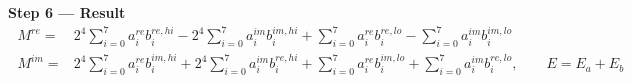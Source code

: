 \documentclass[fleqn]{article}
\begin{document}
\textbf{Step 6 --- Result}
\[
\boxed{\;
\begin{aligned}
M^{re} ={}& 2^{4}\!\sum_{i=0}^{7} a_i^{re} b_i^{re,hi}
  - 2^{4}\!\sum_{i=0}^{7} a_i^{im} b_i^{im,hi}
  + \sum_{i=0}^{7} a_i^{re} b_i^{re,lo}
  - \sum_{i=0}^{7} a_i^{im} b_i^{im,lo} \\[0.3em]
M^{im} ={}& 2^{4}\!\sum_{i=0}^{7} a_i^{re} b_i^{im,hi}
  + 2^{4}\!\sum_{i=0}^{7} a_i^{im} b_i^{re,hi}
  + \sum_{i=0}^{7} a_i^{re} b_i^{im,lo}
  + \sum_{i=0}^{7} a_i^{im} b_i^{re,lo},
\qquad E = E_a + E_b
\end{aligned}
\;}
\]
\end{document}
